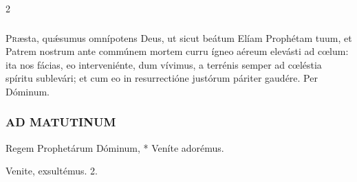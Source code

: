 \documentclass[9pt,twoside]{extarticle}
\begin{document}
\begin{multicols}{2}
\subsubsection*{\center {}}
\lettrine{P}ræsta, quǽsumus omnípotens Deus, ut sicut beátum Elíam Prophétam tuum, et Patrem nostrum ante commúnem mortem curru ígneo aéreum elevásti ad cœlum: ita nos fácias, eo interveniénte, dum vívimus, a terrénis semper ad cœléstia spíritu sublevári; et cum eo in resurrectióne justórum páriter gaudére. Per Dóminum.

\subsubsection*{\center \textsc{AD MATUTINUM}}
\begin{tightlist}{}
\item {} Regem Prophetárum Dóminum, * Veníte adorémus.
\item {} Venite, exsultémus. 2.
\end{tightlist}


\end{multicols}
\end{document}
